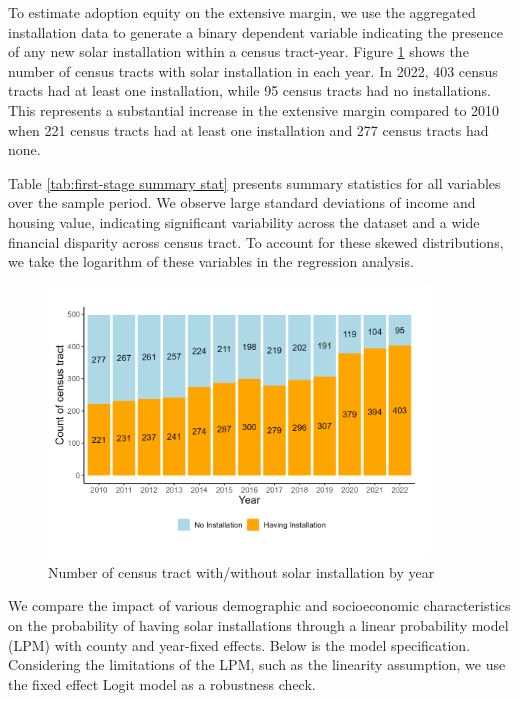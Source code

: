 \documentclass[11pt,twoside,letterpaper]{article}
\begin{document}
To estimate adoption equity on the extensive margin, we use the aggregated installation data to generate a binary dependent variable indicating the presence of any new solar installation within a census tract-year. Figure \ref{fig:stack_installation} shows the number of census tracts with solar installation in each year. In 2022, 403 census tracts had at least one installation, while 95 census tracts had no installations. This represents a substantial increase in the extensive margin compared to 2010 when 221 census tracts had at least one installation and 277 census tracts had none.

Table \ref{tab:first-stage summary stat} presents summary statistics for all variables over the sample period. We observe large standard deviations of income and housing value, indicating significant variability across the dataset and a wide financial disparity across census tract. To account for these skewed distributions, we take the logarithm of these variables in the regression analysis. 

\begin{figure}[!ht]
    \centering
\includegraphics[width=0.9\textwidth]{figures/stack_installation.png}
    \caption{Number of census tract with/without solar installation by year}
    \label{fig:stack_installation}
\end{figure}

We compare the impact of various demographic and socioeconomic characteristics on the probability of having solar installations through a linear probability model (LPM) with county and year-fixed effects. Below is the model specification. Considering the limitations of the LPM, such as the linearity assumption, we use the fixed effect Logit model as a robustness check.
\end{document}
